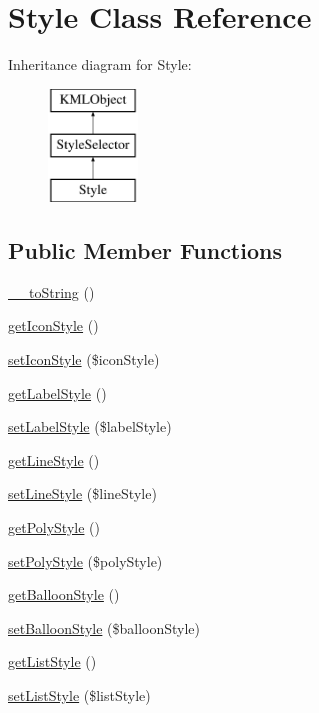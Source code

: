 \hypertarget{classStyle}{
\section{Style Class Reference}
\label{d2/dff/classStyle}
}
Inheritance diagram for Style:\begin{figure}[H]
\begin{center}
\leavevmode
\includegraphics[height=3.000000cm]{d2/dff/classStyle}
\end{center}
\end{figure}
\subsection*{Public Member Functions}
\begin{DoxyCompactItemize}
\item 
\hyperlink{classStyle_a433ef34ba299b36c98e1bab94cb9fa2e}{\_\-\_\-toString} ()
\item 
\hyperlink{classStyle_a71bd29bae19634790b6f5ac2d8ecd5f7}{getIconStyle} ()
\item 
\hyperlink{classStyle_a9cd5f9f72c552999e043bb3c4d35e1de}{setIconStyle} (\$iconStyle)
\item 
\hyperlink{classStyle_a396dd97840e428a7fdfa7e69090c35e2}{getLabelStyle} ()
\item 
\hyperlink{classStyle_aac37b9386fbf371285b9ab224dabf357}{setLabelStyle} (\$labelStyle)
\item 
\hyperlink{classStyle_a767afc421252bb9c48594fac3443af3d}{getLineStyle} ()
\item 
\hyperlink{classStyle_ac06b5280a594438c2001b087bf827c14}{setLineStyle} (\$lineStyle)
\item 
\hyperlink{classStyle_a1648a34f9a7bc618b23848611ed90a4a}{getPolyStyle} ()
\item 
\hyperlink{classStyle_aee33968fc778f8a62b1d69b43147b5fc}{setPolyStyle} (\$polyStyle)
\item 
\hyperlink{classStyle_a745200d228ae4eb1a2427cb7cf839588}{getBalloonStyle} ()
\item 
\hyperlink{classStyle_af56613777a43989f3a56c35122137e78}{setBalloonStyle} (\$balloonStyle)
\item 
\hyperlink{classStyle_af16426d988c1752b8a22d13d3fc1181a}{getListStyle} ()
\item 
\hyperlink{classStyle_a96690119703584470d632aec1359ae3e}{setListStyle} (\$listStyle)
\end{DoxyCompactItemize}


